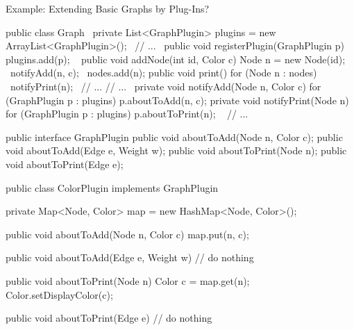 \begin{frame}[fragile,label=GraphsWithPlugins]{Example: Extending Basic Graphs by Plug-Ins?}
	\begin{fancycolumns}
\begin{codetight}[basicstyle=\tiny]{}
public class Graph {
	~private List<GraphPlugin> plugins = new ArrayList<GraphPlugin>();~
	// ...	
	~public void registerPlugin(GraphPlugin p){
		plugins.add(p);
	}~
	public void addNode(int id, Color c){
		Node n = new Node(id);
		~notifyAdd(n, c);~
		nodes.add(n);
	}
	public void print() {
		for (Node n : nodes) {
			~notifyPrint(n);~
			// ...
		}
		// ...
	}
	~private void notifyAdd(Node n, Color c) {
		for (GraphPlugin p : plugins) {
			p.aboutToAdd(n, c);
		}
	}
	private void notifyPrint(Node n) {
		for (GraphPlugin p : plugins) {
			p.aboutToPrint(n);
		}
	}~
	// ...
}
\end{codetight}
		\nextcolumn
\begin{codetight}[basicstyle=\tiny]{}
public interface GraphPlugin {
	public void aboutToAdd(Node n, Color c);
	public void aboutToAdd(Edge e, Weight w);
	public void aboutToPrint(Node n);
	public void aboutToPrint(Edge e);
}
\end{codetight}
\begin{codetight}[basicstyle=\tiny]{}
public class ColorPlugin implements GraphPlugin {
	private Map<Node, Color> map = new HashMap<Node, Color>();

	public void aboutToAdd(Node n, Color c) {
		map.put(n, c);
	}
	
	public void aboutToAdd(Edge e, Weight w) {
		// do nothing
	}
	
	public void aboutToPrint(Node n) {
		Color c = map.get(n);
		Color.setDisplayColor(c);
	}
	
	public void aboutToPrint(Edge e) {
		// do nothing
	}
}
\end{codetight}
	\end{fancycolumns}
\end{frame}

